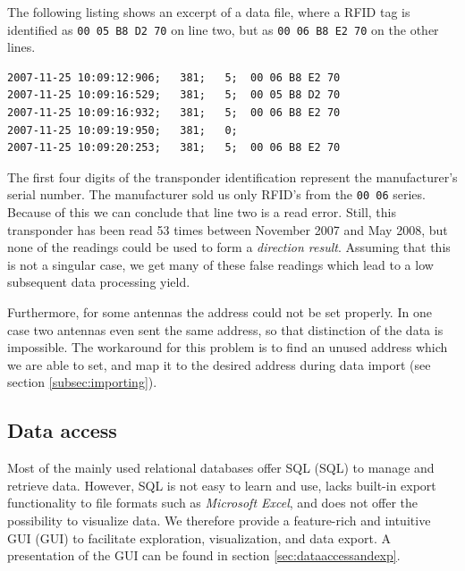 The following listing shows an excerpt of a data file, where a RFID tag is identified as \lstinline|00 05 B8 D2 70| on line two, but as \lstinline|00 06 B8 E2 70| on the other lines. 

\numcodestyle
{}
\begin{lstlisting}[frame=none]
2007-11-25 10:09:12:906;   381;   5;  00 06 B8 E2 70
2007-11-25 10:09:16:529;   381;   5;  00 05 B8 D2 70
2007-11-25 10:09:16:932;   381;   5;  00 06 B8 E2 70
2007-11-25 10:09:19:950;   381;   0; 
2007-11-25 10:09:20:253;   381;   5;  00 06 B8 E2 70
\end{lstlisting}

The first four digits of the transponder identification represent the manufacturer's serial number. The manufacturer sold us only RFID's from the \lstinline|00 06| series. Because of this we can conclude that line two is a read error. Still, this transponder has been read 53 times between November 2007 and May 2008, but none of the readings could be used to form a \textit{direction result}. Assuming that this is not a singular case, we get many of these false readings which lead to a low subsequent data processing yield. 

Furthermore, for some antennas the address could not be set properly. In one case two antennas even sent the same address, so that distinction of the data is impossible. The workaround for this problem is to find an unused address which we are able to set, and map it to the desired address during data import (see section \ref{subsec:importing}).   

\subsection{Data access}
\label{subsec:dataccess}

Most of the mainly used relational databases offer \ac{SQL} (SQL) to manage and retrieve data. However, SQL is not easy to learn and use, lacks built-in export functionality to file formats such as \textit{Microsoft Excel}, and does not offer the possibility to visualize data. We therefore provide a feature-rich and intuitive \acf{GUI} (GUI) to facilitate exploration, visualization, and data export. A presentation of the GUI can be found in section \ref{sec:dataaccessandexp}.
